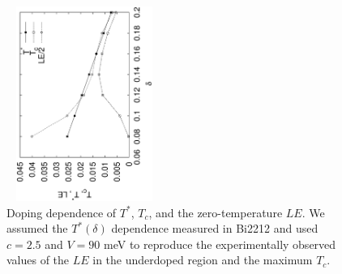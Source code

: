 \documentclass[twoside]{article}
\begin{document}
\begin{figure}
\begin{center}
\includegraphics[width=12pc,height=15pc,angle=-90]{Figtc.ps}
\caption{Doping dependence of $T^*$, $T_c$, and the zero-temperature $LE$. We assumed the $T^*(\delta)$ dependence measured in Bi2212 \cite{ding} and used $c=2.5$ and $V=90$ meV to reproduce the experimentally observed values of the $LE$ in the underdoped region and the maximum $T_c$.}
\label{tctstar}
\end{center}
\end{figure}
\end{document}
